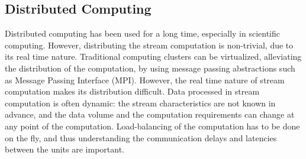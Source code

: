 \subsection{Distributed Computing}
Distributed computing has been used for a long time, especially in scientific computing. However, distributing the stream computation is non-trivial, due to its real time nature. Traditional computing clusters can be virtualized, alleviating the distribution of the computation, by using message passing abstractions such as Message Passing Interface (MPI). However, the real time nature of stream computation makes its distribution difficult. Data processed in stream computation is often dynamic: the stream characteristics are not known in advance, and the data volume and the computation requirements can change at any point of the computation. Load-balancing of the computation has to be done on the fly, and thus understanding the communication delays and latencies between the units are important.


